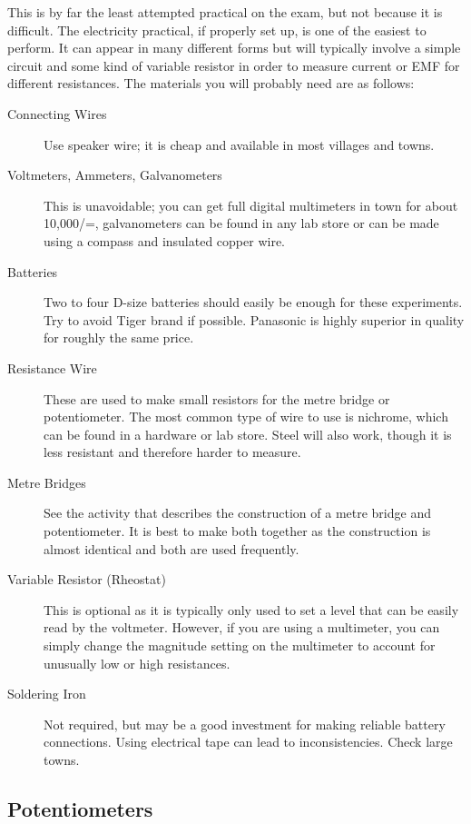 This is by far the least attempted practical on the exam, but not because it is
difficult. The electricity practical, if properly set up, is one of the easiest to perform. It
can appear in many different forms but will typically involve a simple circuit and some
kind of variable resistor in order to measure current or EMF for different resistances. The
materials you will probably need are as follows:

\begin{description}
\item[Connecting Wires]{Use speaker wire; it is cheap and available in most villages
and towns.}
\item[Voltmeters, Ammeters, Galvanometers]{This is unavoidable; you can get full
digital multimeters in town for about 10,000/=, galvanometers can be found in
any lab store or can be made using a compass and insulated copper wire.}
\item[Batteries]{Two to four D-size batteries should easily be enough for these experiments. Try to avoid Tiger brand if possible. Panasonic is highly superior in quality for roughly the same price.}
\item[Resistance Wire]{These are used to make small resistors for
the metre bridge or potentiometer. The most common type of wire to use is
nichrome, which can be found in a hardware or lab store. Steel will also work, though it
is less resistant and therefore harder to measure.}
\item[Metre Bridges]{See the activity that describes the construction of a metre bridge
and potentiometer. It is best to make both together as the construction is almost
identical and both are used frequently.}
\item[Variable Resistor (Rheostat)]{This is optional as it is typically only used to set a
level that can be easily read by the voltmeter. However, if you are using a
multimeter, you can simply change the magnitude setting on the multimeter to
account for unusually low or high resistances.}
\item[Soldering Iron]{Not required, but may be a good investment for making reliable battery connections. Using electrical tape can lead to inconsistencies. Check large towns.}
\end{description}

\subsection{Potentiometers}  

